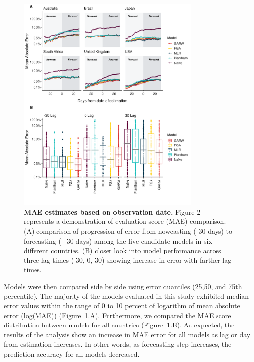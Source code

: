 \documentclass[11pt,oneside,letterpaper]{article}
\begin{document}
\begin{figure}[H]
	\centering
	\includegraphics[width=0.8\textwidth]{figures/model_comp.png}
	\caption{\textbf{MAE estimates based on observation date.}
	Figure 2 represents a demonstration of evaluation score (MAE) comparison. 
	(A) comparison of progression of error from nowcasting (-30 days) to forecasting (+30 days) among the five candidate models in six different countries.
	(B) closer look into model performance across three lag times (-30, 0, 30) showing increase in error with farther lag times. 
	}
	\label{fig:model_comp_fig}
\end{figure}


Models were then compared side by side using error quantiles (25,50, and 75th percentile).
The majority of the models evaluated in this study exhibited median error values within the range of 0 to 10 percent of logarithm of mean absolute error (log(MAE)) (Figure~\ref{fig:model_comp_fig}.A).
Furthermore, we compared the MAE score distribution between models for all countries (Figure~\ref{fig:model_comp_fig}.B).
As expected, the results of the analysis show an increase in MAE error for all models as lag or day from estimation increases. 
In other words, as forecasting step increases, the prediction accuracy for all models decreased.
\end{document}
